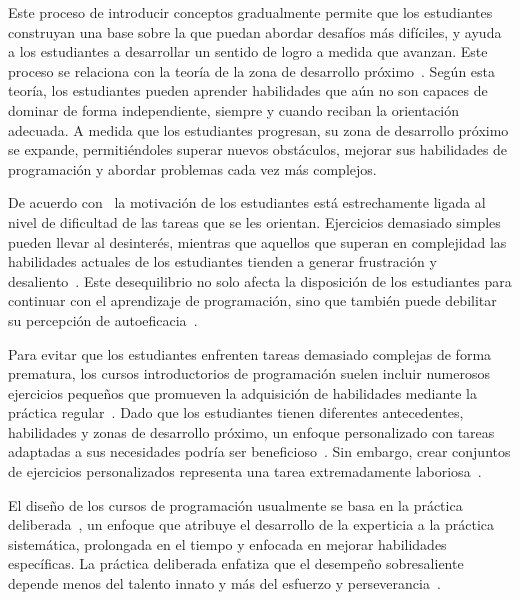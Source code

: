 \documentclass{article}
\begin{document}
Este proceso de introducir conceptos gradualmente permite que los estudiantes construyan una base sobre la que puedan abordar desafíos más difíciles, y ayuda a los estudiantes a desarrollar un sentido de logro a medida que avanzan. Este proceso se relaciona con la teoría de la zona de desarrollo próximo~\cite{vygotsky1978mind}. Según esta teoría, los estudiantes pueden aprender habilidades que aún no son capaces de dominar de forma independiente, siempre y cuando reciban la orientación adecuada. A medida que los estudiantes progresan, su zona de desarrollo próximo se expande, permitiéndoles superar nuevos obstáculos, mejorar sus habilidades de programación y abordar problemas cada vez más complejos.

De acuerdo con~\cite{rosenzweig2019expectancy} la motivación de los estudiantes está estrechamente ligada al nivel de dificultad de las tareas que se les orientan. Ejercicios demasiado simples pueden llevar al desinterés, mientras que aquellos que superan en complejidad las habilidades actuales de los estudiantes tienden a generar frustración y desaliento~\cite{rosenzweig2019expectancy}. Este desequilibrio no solo afecta la disposición de los estudiantes para continuar con el aprendizaje de programación, sino que también puede debilitar su percepción de autoeficacia~\cite{bandura1977self}.

Para evitar que los estudiantes enfrenten tareas demasiado complejas de forma prematura, los cursos introductorios de programación suelen incluir numerosos ejercicios pequeños que promueven la adquisición de habilidades mediante la práctica regular~\cite{allen2018msp, vihavainen2011extreme}. Dado que los estudiantes tienen diferentes antecedentes, habilidades y zonas de desarrollo próximo, un enfoque personalizado con tareas adaptadas a sus necesidades podría ser beneficioso~\cite{leinonen2021exploring}. Sin embargo, crear conjuntos de ejercicios personalizados representa una tarea extremadamente laboriosa~\cite{lobb2016coderunner, wrenn2018whotests}.

El diseño de los cursos de programación usualmente se basa en la práctica deliberada~\cite{ericsson1993deliberate}, un enfoque que atribuye el desarrollo de la experticia a la práctica sistemática, prolongada en el tiempo y enfocada en mejorar habilidades específicas. La práctica deliberada enfatiza que el desempeño sobresaliente depende menos del talento innato y más del esfuerzo y perseverancia~\cite{duckworth2013true}.

\end{document}
